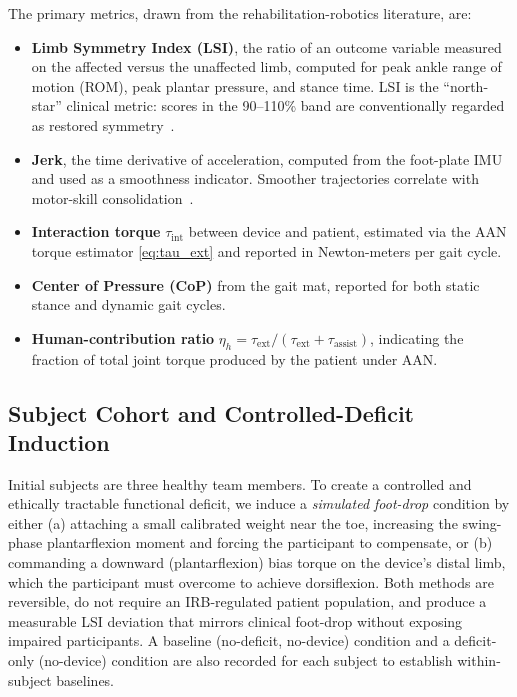 \documentclass[conference]{IEEEtran}
\begin{document}
The primary metrics, drawn from the rehabilitation-robotics literature, are:
\begin{itemize}
\item \textbf{Limb Symmetry Index (LSI)}, the ratio of an outcome variable measured on the affected versus the unaffected limb, computed for peak ankle range of motion (ROM), peak plantar pressure, and stance time. LSI is the ``north-star'' clinical metric: scores in the 90--110\% band are conventionally regarded as restored symmetry~\cite{hidayah2020calex}.
\item \textbf{Jerk}, the time derivative of acceleration, computed from the foot-plate IMU and used as a smoothness indicator. Smoother trajectories correlate with motor-skill consolidation~\cite{marchal2009review}.
\item \textbf{Interaction torque} $\tau_{\mathrm{int}}$ between device and patient, estimated via the AAN torque estimator \eqref{eq:tau_ext} and reported in Newton-meters per gait cycle.
\item \textbf{Center of Pressure (CoP)} from the gait mat, reported for both static stance and dynamic gait cycles.
\item \textbf{Human-contribution ratio} $\eta_h=\tau_{\mathrm{ext}}/(\tau_{\mathrm{ext}}+\tau_{\mathrm{assist}})$, indicating the fraction of total joint torque produced by the patient under AAN.
\end{itemize}

\subsection{Subject Cohort and Controlled-Deficit Induction}

Initial subjects are three healthy team members. To create a controlled and ethically tractable functional deficit, we induce a \emph{simulated foot-drop} condition by either (a) attaching a small calibrated weight near the toe, increasing the swing-phase plantarflexion moment and forcing the participant to compensate, or (b) commanding a downward (plantarflexion) bias torque on the device's distal limb, which the participant must overcome to achieve dorsiflexion. Both methods are reversible, do not require an IRB-regulated patient population, and produce a measurable LSI deviation that mirrors clinical foot-drop without exposing impaired participants. A baseline (no-deficit, no-device) condition and a deficit-only (no-device) condition are also recorded for each subject to establish within-subject baselines.
\end{document}
